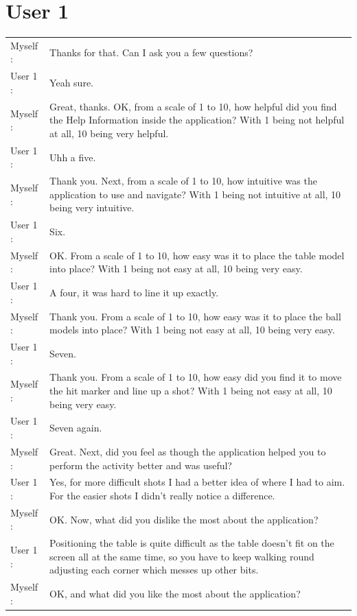 \documentclass[ %
                author={Finn Alexander Wilkinson},
                supervisor={Dr. Andrew Calway},
                degree={MEng},
                title={\centering A Mixed Reality Aim Assistant for Pool and Snooker},
                subtitle={},
                type={Enterprise},
                year={2021} ]{dissertation}
\begin{document}
\section{User 1}
\begin{tabular}{l p{130mm}}
    Myself : & Thanks for that. Can I ask you a few questions? \\
    User 1 : & Yeah sure.\\
    Myself : & Great, thanks. OK, from a scale of 1 to 10, how helpful did you find the Help Information inside the application? With 1 being not helpful at all, 10 being very helpful. \\
    User 1 : & Uhh a five.\\
    Myself : & Thank you. Next, from a scale of 1 to 10, how intuitive was the application to use and navigate? With 1 being not intuitive at all, 10 being very intuitive.\\
    User 1 : & Six.\\
    Myself : & OK. From a scale of 1 to 10, how easy was it to place the table model into place? With 1 being not easy at all, 10 being very easy.\\
    User 1 : & A four, it was hard to line it up exactly.\\
    Myself : & Thank you. From a scale of 1 to 10, how easy was it to place the ball models into place? With 1 being not easy at all, 10 being very easy.\\ 
    User 1 : & Seven. \\
    Myself : & Thank you. From a scale of 1 to 10, how easy did you find it to move the hit marker and line up a shot? With 1 being not easy at all, 10 being very easy. \\
    User 1 : & Seven again.\\
    Myself : & Great. Next, did you feel as though the application helped you to perform the activity better and was useful? \\
    User 1 : & Yes, for more difficult shots I had a better idea of where I had to aim. For the easier shots I didn't really notice a difference.\\
    Myself : & OK. Now, what did you dislike the most about the application? \\
    User 1 : & Positioning the table is quite difficult as the table doesn't fit on the screen all at the same time, so you have to keep walking round adjusting each corner which messes up other bits.\\
    Myself : & OK, and what did you like the most about the application? \\

\end{tabular}
\end{document}
